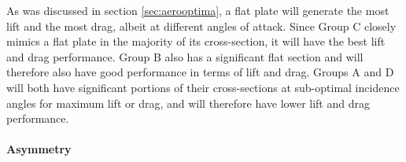 As was discussed in section \ref{sec:aerooptima}, a flat plate will generate the most lift and the most drag, albeit at different angles of attack. Since Group C closely mimics a flat plate in the majority of its cross-section, it will have the best lift and drag performance. Group B also has a significant flat section and will therefore also have good performance in terms of lift and drag. Groups A and D will both have significant portions of their cross-sections at sub-optimal incidence angles for maximum lift or drag, and will therefore have lower lift and drag performance.



\paragraph{Asymmetry}























